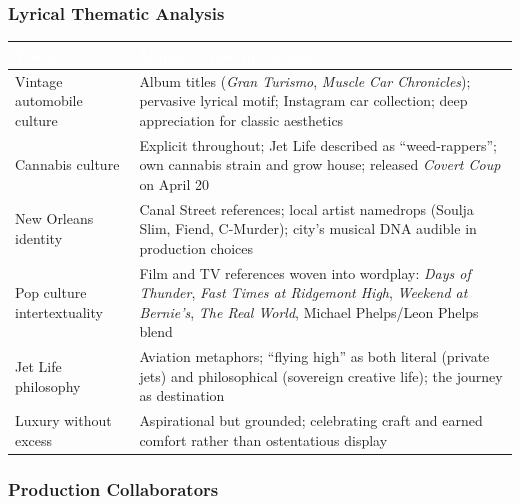\documentclass[11pt,letterpaper]{article}
\newcommand{\tableheader}[1]{\textbf{\sffamily\textcolor{white}{#1}}}
\begin{document}
\subsubsection{Lyrical Thematic Analysis}

\begin{center}
\begin{tabularx}{\textwidth}{L{3.5cm}X}
\toprule
{}
\tableheader{Theme} & \tableheader{Manifestation in Catalog} \\
\midrule
Vintage automobile culture & Album titles (\textit{Gran Turismo}, \textit{Muscle Car Chronicles}); pervasive lyrical motif; Instagram car collection; deep appreciation for classic aesthetics \\
Cannabis culture & Explicit throughout; Jet Life described as ``weed-rappers''; own cannabis strain and grow house; released \textit{Covert Coup} on April 20 \\
New Orleans identity & Canal Street references; local artist namedrops (Soulja Slim, Fiend, C-Murder); city's musical DNA audible in production choices \\
Pop culture intertextuality & Film and TV references woven into wordplay: \textit{Days of Thunder}, \textit{Fast Times at Ridgemont High}, \textit{Weekend at Bernie's}, \textit{The Real World}, Michael Phelps/Leon Phelps blend \\
Jet Life philosophy & Aviation metaphors; ``flying high'' as both literal (private jets) and philosophical (sovereign creative life); the journey as destination \\
Luxury without excess & Aspirational but grounded; celebrating craft and earned comfort rather than ostentatious display \\
\bottomrule
\end{tabularx}
\end{center}

\subsubsection{Production Collaborators}
\end{document}
